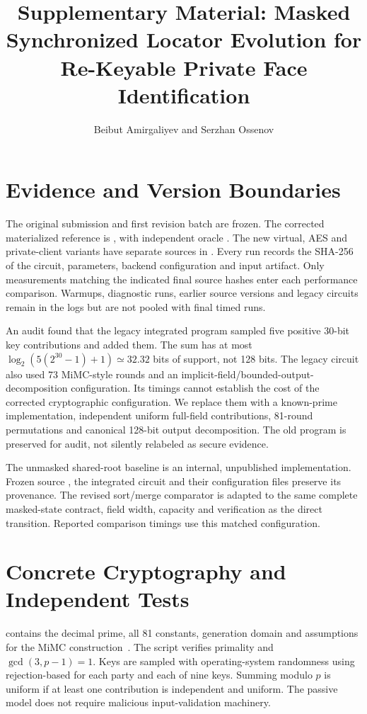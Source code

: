 \documentclass[journal,onecolumn]{IEEEtran}
\begin{document}
\title{Supplementary Material: Masked Synchronized Locator Evolution for Re-Keyable Private Face Identification}
\author{Beibut Amirgaliyev and Serzhan Ossenov}\maketitle

\section{Evidence and Version Boundaries}\label{suppsec:supplement:1}
The original submission and first revision batch are frozen. The corrected materialized reference is , with independent oracle . The new virtual, AES and private-client variants have separate sources in . Every run records the SHA-256 of the circuit, parameters, backend configuration and input artifact. Only measurements matching the indicated final source hashes enter each performance comparison. Warmups, diagnostic runs, earlier source versions and legacy circuits remain in the logs but are not pooled with final timed runs.

An audit found that the legacy integrated program sampled five positive 30-bit key contributions and added them. The sum has at most $\log_2(5(2^{30}-1)+1)\simeq32.32$ bits of support, not 128 bits. The legacy circuit also used 73 MiMC-style rounds and an implicit-field/bounded-output-decomposition configuration. Its timings cannot establish the cost of the corrected cryptographic configuration. We replace them with a known-prime implementation, independent uniform full-field contributions, 81-round permutations and canonical 128-bit output decomposition. The old program is preserved for audit, not silently relabeled as secure evidence.

The unmasked shared-root baseline is an internal, unpublished implementation. Frozen source , the integrated circuit and their configuration files preserve its provenance. The revised sort/merge comparator is adapted to the same complete masked-state contract, field width, capacity and verification as the direct transition. Reported comparison timings use this matched configuration.

\section{Concrete Cryptography and Independent Tests}\label{suppsec:supplement:2}
 contains the decimal prime, all 81 constants, generation domain and assumptions for the MiMC construction~\cite{albrecht2016mimc}. The script  verifies primality and $\gcd(3,p-1)=1$. Keys are sampled with operating-system randomness using rejection-based  for each party and each of nine keys. Summing modulo $p$ is uniform if at least one contribution is independent and uniform. The passive model does not require malicious input-validation machinery.
\end{document}
